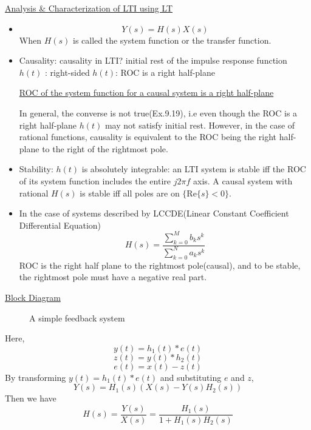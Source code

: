 \documentclass{article}
\begin{document}
\underline{Analysis \& Characterization of LTI using LT}
\begin{itemize}
\item \[Y(s)=H(s)X(s)\]
When $H(s)$ is called the system function or the transfer function.
\item Causality: causality in LTI? initial rest of the impulse response function $h(t)$ : right-sided $h(t)$: ROC is a right half-plane

\underline{ROC of the system function for a causal system is a right half-plane}

In general, the converse is not true(Ex.9.19), i.e even though the ROC is a right half-plane $h(t)$ may not satisfy initial rest. However, in the case of rational functions, causality is equivalent to the ROC being the right half-plane to the right of the rightmost pole.
\item Stability: $h(t)$ is absolutely integrable: an LTI system is stable iff the ROC of its system function includes the entire $j2\pi f$ axis. A causal system with rational $H(s)$ is stable iff all poles are on $\{\mathrm{Re}\{s\} < 0\}$.
\item In the case of systems described by LCCDE(Linear Constant Coefficient Differential Equation)
\[H(s)=\frac{\sum_{k=0}^{M}b_ks^k}{\sum_{k=0}^{N}a_ks^k}\]
ROC is the right half plane to the rightmost pole(causal), and to be stable, the rightmost pole must have a negative real part.
\end{itemize}
\underline{Block Diagram}

\begin{figure}[htb]
\centering
{}
\caption{A simple feedback system}
\end{figure}
Here, 
\[y(t)=h_1(t)*e(t)\]
\[z(t)=y(t)*h_2(t)\]
\[e(t)=x(t)-z(t)\]
By transforming $y(t)=h_1(t)*e(t)$ and substituting $e$ and $z$,
\[Y(s)=H_1(s)(X(s)-Y(s)H_2(s))\]
Then we have
\[H(s)=\frac{Y(s)}{X(s)}=\frac{H_1(s)}{1+H_1(s)H_2(s)}\]
\end{document}
